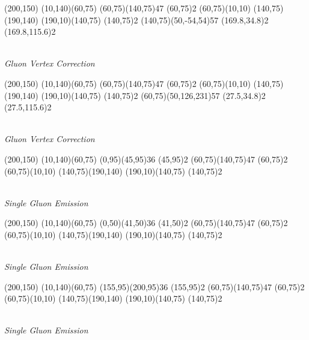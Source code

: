 \documentclass{article}
\begin{document}
\begin{center}
	\begin{axopicture}(200,150)
		\Line[arrow](10,140)(60,75)
		\Photon(60,75)(140,75){4}{7}
		\Vertex(60,75){2}
		\Line[arrow](60,75)(10,10)
		\Line[arrow](140,75)(190,140)
		\Line[arrow](190,10)(140,75)
		\Vertex(140,75){2}
		\GluonArc(140,75)(50,-54,54){5}{7}
		\Vertex(169.8,34.8){2}
		\Vertex(169.8,115.6){2}
	\end{axopicture}
\\ {\sl Gluon Vertex Correction}
\end{center}



\begin{center}
	\begin{axopicture}(200,150)
		\Line[arrow](10,140)(60,75)
		\Photon(60,75)(140,75){4}{7}
		\Vertex(60,75){2}
		\Line[arrow](60,75)(10,10)
		\Line[arrow](140,75)(190,140)
		\Line[arrow](190,10)(140,75)
		\Vertex(140,75){2}
		\GluonArc(60,75)(50,126,231){5}{7}
		\Vertex(27.5,34.8){2}
		\Vertex(27.5,115.6){2}
	\end{axopicture}
\\ {\sl Gluon Vertex Correction}
\end{center}




\begin{center}
	\begin{axopicture}(200,150)
		\Line[arrow](10,140)(60,75)
		\Gluon(0,95)(45,95){3}{6}
		\Vertex(45,95){2}
		\Photon(60,75)(140,75){4}{7}
		\Vertex(60,75){2}
		\Line[arrow](60,75)(10,10)
		\Line[arrow](140,75)(190,140)
		\Line[arrow](190,10)(140,75)
		\Vertex(140,75){2}
	\end{axopicture}
\\ {\sl Single Gluon Emission}
\end{center}

\begin{center}
	\begin{axopicture}(200,150)
		\Line[arrow](10,140)(60,75)
		\Gluon(0,50)(41,50){3}{6}
		\Vertex(41,50){2}
		\Photon(60,75)(140,75){4}{7}
		\Vertex(60,75){2}
		\Line[arrow](60,75)(10,10)
		\Line[arrow](140,75)(190,140)
		\Line[arrow](190,10)(140,75)
		\Vertex(140,75){2}
	\end{axopicture}
\\ {\sl Single Gluon Emission}
\end{center}

\begin{center}
	\begin{axopicture}(200,150)
		\Line[arrow](10,140)(60,75)
		\Gluon(155,95)(200,95){3}{6}
		\Vertex(155,95){2}
		\Photon(60,75)(140,75){4}{7}
		\Vertex(60,75){2}
		\Line[arrow](60,75)(10,10)
		\Line[arrow](140,75)(190,140)
		\Line[arrow](190,10)(140,75)
		\Vertex(140,75){2}
	\end{axopicture}
\\ {\sl Single Gluon Emission}
\end{center}
\end{document}
